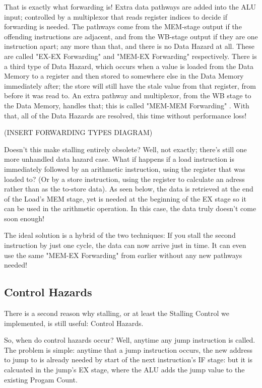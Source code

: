 \documentclass[12pt,twoside]{reedthesis}
\begin{document}
That is exactly what forwarding is! Extra data pathways are added  into the ALU input; controlled by a multiplexor that reads register indices to decide if forwarding is needed. The pathways come from the MEM-stage output if the offending instructions are adjacent, and from the WB-stage output if they are one instruction apart; any more than that, and there is no Data Hazard at all. These are called "EX-EX Forwarding" and "MEM-EX Forwarding" respectively. There is a third type of Data Hazard, which occurs when a value is loaded from the Data Memory to a register and then stored to somewhere else in the Data Memory immediately after; the store will still have the stale value from that register, from before it was read to. An extra pathway and multiplexor, from the WB stage to the Data Memory, handles that; this is called "MEM-MEM Forwarding" . With that, all of the Data Hazards are resolved, this time without performance loss!

(INSERT FORWARDING TYPES DIAGRAM)

Doesn't this make stalling entirely obsolete? Well, not exactly; there's still one more unhandled data hazard case. What if happens if a load instruction is immediately followed by an arithmetic instruction, using the register that was loaded to? (Or by a store instruction, using the register to calculate an adress rather than as the to-store data). As seen below, the data is retrieved at the end of the Load's MEM stage, yet is needed at the beginning of the EX stage so it can be used in the arithmetic operation. In this case, the data truly doesn't come soon enough!

The ideal solution is a hybrid of the two techniques: If you stall the second instruction by just one cycle, the data can now arrive just in time. It can even use the same "MEM-EX Forwarding" from earlier without any new pathways needed!

\subsection{Control Hazards}

There is a second reason why stalling, or at least the Stalling Control we implemented, is still useful: Control Hazards.

So, when do control hazards occur? Well, anytime any jump instruction is called. The problem is simple: anytime that a jump instruction occurs, the new address to jump to is already needed by start of the next instruction's IF stage: but it is calcuated in the jump's EX stage, where the ALU adds the jump value to the existing Progam Count.
\end{document}

